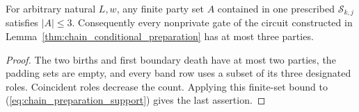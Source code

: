 \begin{lemma}
    \label{thm:chain_stage_arity_three}
    \leanok
    For arbitrary natural $L,w$, any finite party set $A$ contained in
    one prescribed $\mathcal S_{k,j}$ satisfies $|A|\le3$.
    Consequently every nonprivate gate of the circuit constructed in
    Lemma~\ref{thm:chain_conditional_preparation} has at most three parties.
\end{lemma}
\begin{proof}\leanok
    The two births and first boundary death have at most two parties,
    the padding sets are empty, and every band row uses a subset of
    its three designated roles. Coincident roles decrease the count.
    Applying this finite-set bound to
    (\ref{eq:chain_preparation_support}) gives the last assertion.
\end{proof}

